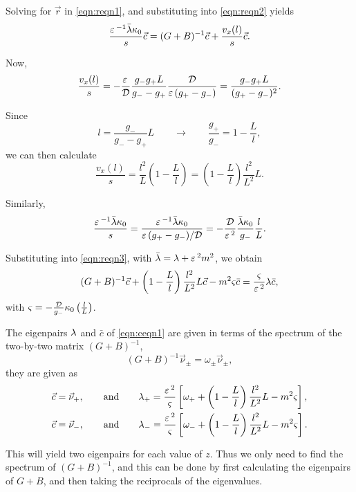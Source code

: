 Solving for $\vec{r}$ in \eqref{eqn:reqn1}, and substituting into \eqref{eqn:reqn2} yields
% 
\begin{equation}
\label{eqn:reqn3}
 \frac{\varepsilon\,^{-1}\bar{\lambda}\kappa_0}{s}\vec{c} = (G+B)^{-1}\vec{c} + \frac{v_x(l)}{s}\vec{c}.
\end{equation}
% 

Now, 
% 
\[
  \frac{v_x(l)}{s} = -\frac{\varepsilon\,}{\mathcal{D}}\frac{g_-g_+L}{g_--g_+}\frac{\mathcal{D}}{\varepsilon\,(g_+-g_-)} = \frac{g_-g_+L}{(g_+-g_-)^2}.
\]
% 

Since 
% 
\[
  l=\frac{g_-}{g_--g_+}L\qquad\rightarrow\qquad\frac{g_+}{g_-} = 1-\frac{L}{l},
\]
% 
we can then calculate
% 
\begin{equation}
\label{eqn:vx}
  \frac{v_x(l)}{s} = \frac{l^2}{L}\left(1-\frac{L}{l} \right) = \left(1-\frac{L}{l} \right)\frac{l^2}{L^2}L.
\end{equation}
% 

Similarly,
% 
\[
  \frac{\varepsilon\,^{-1}\bar{\lambda}\kappa_0}{s} = \frac{\varepsilon\,^{-1}\bar{\lambda}\kappa_0}{\varepsilon\,(g_+-g_-)/\mathcal{D}} = -\frac{\mathcal{D}}{\varepsilon\,^2}\frac{\bar{\lambda}\kappa_0}{g_-}\frac{l}{L}.
\]
% 

Substituting into \eqref{eqn:reqn3}, with $\bar{\lambda} = \lambda + \varepsilon\,^2m^2$, we obtain
% 
\begin{equation}
\label{eqn:ceqn1}
(G+B)^{-1}\vec{c} + \left(1- \frac{L}{l}\right)\frac{l^2}{L^2}L\vec{c} - m^2\varsigma\bar{c} = \frac{\varsigma}{\varepsilon\,^2}\lambda\bar{c},
\end{equation}
% 
with $\varsigma = -\frac{\mathcal{D}}{g_-}\kappa_0\left(\frac{l}{L} \right)$.

The eigenpairs $\lambda$ and $\bar{c}$ of \eqref{eqn:ceqn1} are given in terms of the spectrum of the two-by-two matrix $(G+B)^{-1}$, 
% 
\[
 (G+B)^{-1}\vec{\nu}_{\pm} = \omega_{\pm}\vec{\nu}_{\pm},
\]
% 
they are given as
% 
\begin{equation}
\label{eqn:lam2}
	\begin{split}
	\begin{aligned}
	  \vec{c} &= \vec{\nu}_+,\qquad\text{and}\qquad \lambda_+ = \frac{\varepsilon\,^2}{\varsigma}\left[\omega_+ + \left(1- \frac{L}{l}\right)\frac{l^2}{L^2}L - m^2\varsigma \right],\\
	  \vec{c} &= \vec{\nu}_-,\qquad\text{and}\qquad \lambda_- = \frac{\varepsilon\,^2}{\varsigma}\left[\omega_- + \left(1- \frac{L}{l}\right)\frac{l^2}{L^2}L - m^2\varsigma \right].
	\end{aligned}
	\end{split}
\end{equation}
%

This will yield two eigenpairs for each value of $z$. Thus we only need to find the spectrum of $(G+B)^{-1}$, and this can be done by first calculating the eigenpairs of $G+B$, and then taking the reciprocals of the eigenvalues.


